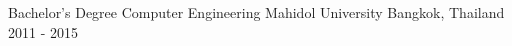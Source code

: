 

\begin{cventries}

  \cventry
    {Bachelor's Degree Computer Engineering} %
    {Mahidol University} %
    {Bangkok, Thailand} %
    {2011 - 2015} %
\end{cventries}
